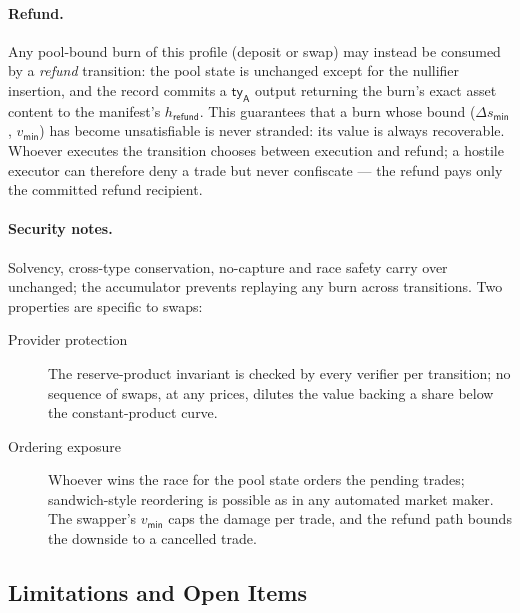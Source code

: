 \paragraph{Refund.} Any pool-bound burn of this profile (deposit or swap) may instead be consumed by a \emph{refund} transition: the pool state is unchanged except for the nullifier insertion, and the record commits a $\mathsf{ty}_\mathsf{A}$ output returning the burn's exact asset content to the manifest's $h_\mathsf{refund}$. This guarantees that a burn whose bound ($\Delta s_\mathsf{min}$, $v_\mathsf{min}$) has become unsatisfiable is never stranded: its value is always recoverable. Whoever executes the transition chooses between execution and refund; a hostile executor can therefore deny a trade but never confiscate --- the refund pays only the committed refund recipient.

\paragraph{Security notes.} Solvency, cross-type conservation, no-capture and race safety carry over unchanged; the accumulator prevents replaying any burn across transitions. Two properties are specific to swaps:
\begin{description}
	\item[Provider protection] The reserve-product invariant is checked by every verifier per transition; no sequence of swaps, at any prices, dilutes the value backing a share below the constant-product curve.
	\item[Ordering exposure] Whoever wins the race for the pool state orders the pending trades; sandwich-style reordering is possible as in any automated market maker. The swapper's $v_\mathsf{min}$ caps the damage per trade, and the refund path bounds the downside to a cancelled trade.
\end{description}

\subsection{Limitations and Open Items}

